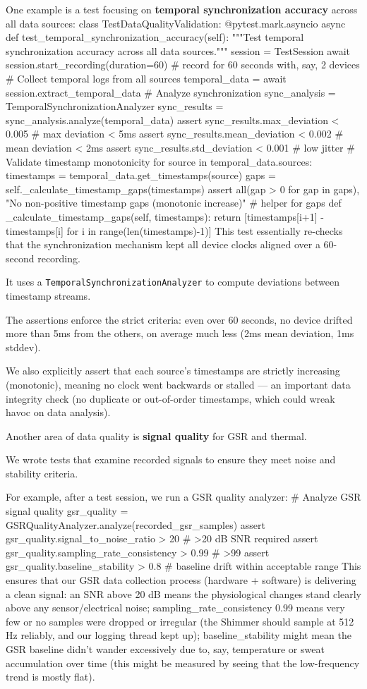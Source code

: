 {{One example is a test focusing on \textbf{temporal synchronization accuracy}
 across all data sources: class TestDataQualityValidation: @pytest.mark.asyncio async
 def test\_temporal\_synchronization\_accuracy(self): """Test temporal
 synchronization accuracy across all data sources.""" session = TestSession await
 session.start\_recording(duration=60) # record for 60 seconds with, say, 2 devices #
 Collect temporal logs from all sources temporal\_data = await
 session.extract\_temporal\_data # Analyze synchronization sync\_analysis =
 TemporalSynchronizationAnalyzer sync\_results =
 sync\_analysis.analyze(temporal\_data) assert sync\_results.max\_deviation < 0.005 #
 max deviation < 5ms assert sync\_results.mean\_deviation < 0.002 # mean deviation <
 2ms assert sync\_results.std\_deviation < 0.001 # low jitter # Validate timestamp
 monotonicity for source in temporal\_data.sources: timestamps =
 temporal\_data.get\_timestamps(source) gaps =
 self.\_calculate\_timestamp\_gaps(timestamps) assert all(gap > 0 for gap in gaps),
 "No non-positive timestamp gaps (monotonic increase)" # helper for gaps def
 \_calculate\_timestamp\_gaps(self, timestamps): return [timestamps[i+1] -
 timestamps[i] for i in range(len(timestamps)-1)] This test essentially re-checks
 that the synchronization mechanism kept all device clocks aligned over a 60-second
 recording.

It uses a \texttt{TemporalSynchronizationAnalyzer} to compute deviations between
timestamp streams.

The assertions enforce the strict criteria: even over 60 seconds, no device drifted
more than 5ms from the others, on average much less (2ms mean deviation, 1ms stddev).

We also explicitly assert that each source's timestamps are strictly increasing
(monotonic), meaning no clock went backwards or stalled --- an important data
integrity check (no duplicate or out-of-order timestamps, which could wreak havoc on
data analysis).

Another area of data quality is \textbf{signal quality}
 for GSR and thermal.

We wrote tests that examine recorded signals to ensure they meet noise and stability
criteria.

For example, after a test session, we run a GSR quality analyzer: # Analyze GSR
signal quality gsr\_quality = GSRQualityAnalyzer.analyze(recorded\_gsr\_samples)
assert gsr\_quality.signal\_to\_noise\_ratio > 20 # >20 dB SNR required assert
gsr\_quality.sampling\_rate\_consistency > 0.99 # >99%
assert gsr\_quality.baseline\_stability > 0.8 # baseline drift within acceptable
range This ensures that our GSR data collection process (hardware + software) is
delivering a clean signal: an SNR above 20 dB means the physiological changes stand
clearly above any sensor/electrical noise; sampling\_rate\_consistency 0.99 means
very few or no samples were dropped or irregular (the Shimmer should sample at 512 Hz
reliably, and our logging thread kept up); baseline\_stability  might mean the
GSR baseline didn't wander excessively due to, say, temperature or sweat accumulation
over time (this might be measured by seeing that the low-frequency trend is mostly
flat).

}}
